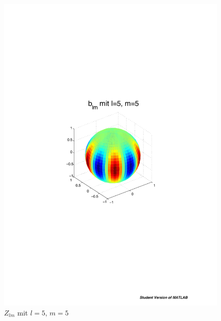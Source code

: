 \begin{refsection}
\begin{figure}
\begin{minipage}[hbt]{0.4\textwidth}
\includegraphics[width=1\textwidth]{kugel/ylm/b_5_5.pdf}
\caption{$Z_{lm}$ mit $l=5$, $m=5$}
\label{skript:zlm l=5 m=5}
\end{minipage}
\end{figure}


\end{refsection}
